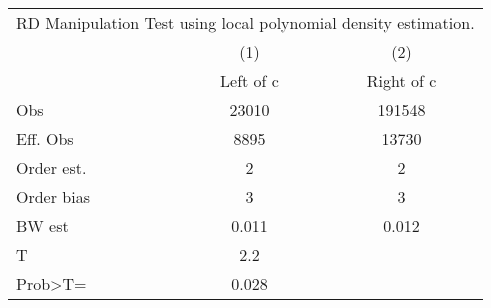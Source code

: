 \begin{tabular}{l cc }\hline\hline   \multicolumn{3}{c}{RD Manipulation Test using local polynomial density estimation.}   \\  & (1) &  (2)   \\ 
&Left of c&Right of c\\
Obs&23010&191548\\
Eff. Obs&8895&13730\\
Order est.&2&2\\
Order bias&3&3\\
BW est&0.011&0.012\\
\hline
T&2.2&\\
Prob>T=&0.028&\\
\hline
\end{tabular}
